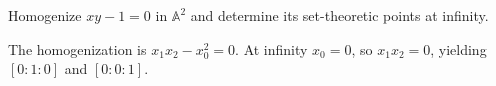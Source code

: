 \begin{problem}\label{prob:vi36-11}
Homogenize \(xy-1=0\) in \(\mathbb A^2\) and determine its set-theoretic points at infinity.
\begin{solution}
The homogenization is \(x_1x_2-x_0^2=0\).  At infinity \(x_0=0\), so \(x_1x_2=0\), yielding \([0:1:0]\) and \([0:0:1]\).
\end{solution}
\end{problem}
